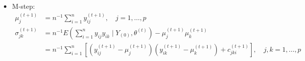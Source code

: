 \begin{example}
\begin{itemize}
		\item M-step:
		      \begin{equation}
			      \begin{aligned}
				      \mu_{j}^{(t+1)}      & =n^{-1} \sum_{i=1}^{n} y_{i j}^{(t+1)}, \quad j=1, \ldots, p                                                                                                           \\
				      \sigma_{j k}^{(t+1)} & =n^{-1} E\left(\sum_{i=1}^{n} y_{i j} y_{i k} \mid Y_{(0)}, \theta^{(t)}\right)-\mu_{j}^{(t+1)} \mu_{k}^{(t+1)}                                                        \\
				                           & =n^{-1} \sum_{i=1}^{n}\left[\left(y_{i j}^{(t+1)}-\mu_{j}^{(t+1)}\right)\left(y_{i k}^{(t+1)}-\mu_{k}^{(t+1)}\right)+c_{j k i}^{(t+1)}\right], \quad j, k=1, \ldots, p
			      \end{aligned}
		      \end{equation}
	\end{itemize}
\end{example}

